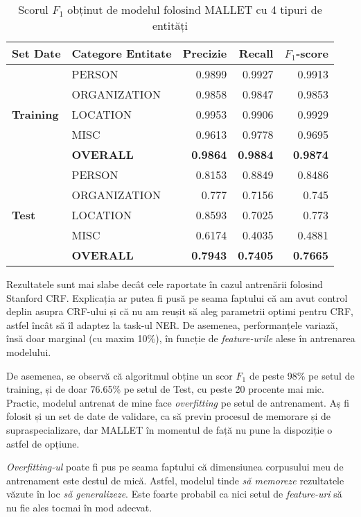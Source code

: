 \begin{center}
\begin{table}[htb]
  \caption{Scorul $F_1$ obținut de modelul folosind MALLET cu 4 tipuri de entități}
  \begin{tabular}{|l|l|r|r|r|}
  \hline  
  Set Date & Categore Entitate & Precizie & Recall & $F_1$-score \\
  \hline  
  \multirow{5}{*}{\textbf{Training}} & PERSON & 0.9899 & 0.9927 & 0.9913 \\
  & ORGANIZATION & 0.9858 & 0.9847 & 0.9853 \\
  & LOCATION & 0.9953 & 0.9906 & 0.9929 \\
  & MISC & 0.9613 & 0.9778  & 0.9695 \\
   \hline 
  & \textbf{OVERALL} &\textbf{0.9864} & \textbf{0.9884} & \textbf{0.9874 }\\
  \hline  
  
  \multirow{5}{*}{\textbf{Test}} & PERSON & 0.8153 & 0.8849 & 0.8486 \\
    & ORGANIZATION & 0.777 & 0.7156 & 0.745 \\
    & LOCATION & 0.8593 & 0.7025 & 0.773 \\
    & MISC & 0.6174 & 0.4035  & 0.4881 \\
     \hline 
    & \textbf{OVERALL} & \textbf{0.7943} & \textbf{0.7405} & \textbf{0.7665} \\
    \hline  
  \end{tabular}
  \label{table:f1-score-mallet}
\end{table}
\end{center}

Rezultatele sunt mai slabe decât cele raportate în cazul antrenării folosind Stanford CRF. Explicația ar putea fi pusă pe seama faptului că am avut control deplin asupra CRF-ului și că nu am reușit să aleg parametrii optimi pentru CRF, astfel încât să îl adaptez la task-ul NER. De asemenea, performanțele variază, însă doar marginal (cu maxim 10\%), în funcție de \textit{feature-urile} alese în antrenarea modelului.

De asemenea, se observă că algoritmul obține un scor $F_1$ de peste 98\% pe setul de training, și de doar 76.65\% pe setul de Test, cu peste 20 procente mai mic. Practic, modelul antrenat de mine face \textit{overfitting} pe setul de antrenament. Aș fi folosit și un set de date de validare, ca să previn procesul de memorare și de supraspecializare, dar MALLET în momentul de față nu pune la dispoziție o astfel de opțiune.

\textit{Overfitting-ul} poate fi pus pe seama faptului că dimensiunea corpusului meu de antrenament este destul de mică. Astfel, modelul tinde \textit{să memoreze} rezultatele văzute în loc \textit{să generalizeze}. Este foarte probabil ca nici setul de \textit{feature-uri} să nu fie ales tocmai în mod adecvat.


















